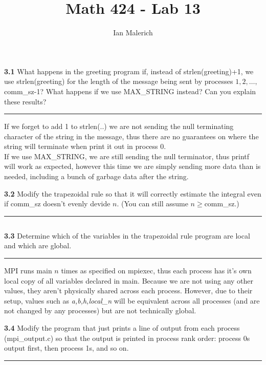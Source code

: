 \documentclass[12pt]{jhwhw}
\author{Ian Malerich}
\title{Math 424 - Lab 13}
\begin{document}
\raggedright


\textbf{3.1}
	What happens in the greeting program if, instead of strlen(greeting)+1,
	we use strlen(greeting) for the length of the message being sent
	by processes $1,2,\ldots,$comm_sz-1? What happens if we use MAX_STRING instead?
	Can you explain these results?
\textcolor[RGB]{240,240,240}{\rule{\textwidth}{0.5pt}}\bigbreak

	\begin{addmargin}[1em]{}
		If we forget to add 1 to strlen(..) we are not sending the null terminating
		character of the string in the message, thus there are no guarantees on
		where the string will terminate when print it out in process 0. \\
		If we use MAX_STRING, we are still sending the null terminator, thus
		printf will work as expected, however this time we are simply sending
		more data than is needed, including a bunch of garbage data after the string. \\
	\end{addmargin}

\textbf{3.2}
	Modify the trapezoidal rule so that it will correctly estimate the integral
	even if comm_sz doesn't evenly devide $n$. (You can still assume $n\geq$comm_sz.)
\textcolor[RGB]{240,240,240}{\rule{\textwidth}{0.5pt}}\bigbreak

	\begin{addmargin}[1em]{}
		\inputminted{c}{3.2.c}
	\end{addmargin}

\textbf{3.3}
	Determine which of the variables in the trapezoidal rule program are local and which 
	are global.
\textcolor[RGB]{240,240,240}{\rule{\textwidth}{0.5pt}}\bigbreak

	\begin{addmargin}[1em]{}
		MPI runs main $n$ times as specified on mpiexec, thus each process has it's own local copy
		of all variables declared in main. Because we are not using any other values, they aren't
		physically shared across each process. However, due to their setup, values such as 
		\textit{a,b,h,local_n} will be equivalent across all processes (and are not changed by 
		any processes) but are not technically global.
	\end{addmargin}

\textbf{3.4}
	Modify the program that just prints a line of output from each process (mpi_output.c) so
	that the output is printed in process rank order: process 0s output first, then process 1s,
	and so on.
\textcolor[RGB]{240,240,240}{\rule{\textwidth}{0.5pt}}\bigbreak
\end{document}
